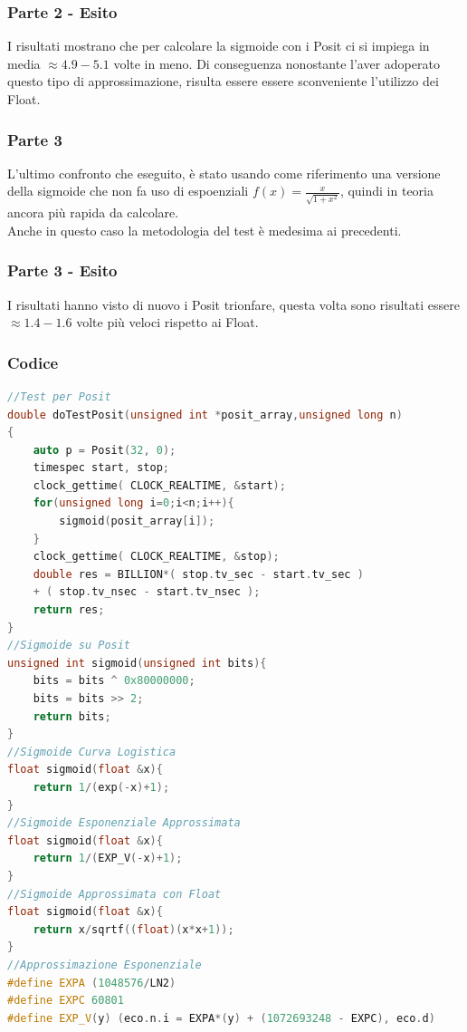 \documentclass[a4paper,11pt]{article}
\begin{document}
\subsubsection{Parte 2 - Esito}

I risultati mostrano che per calcolare la sigmoide con i Posit ci si impiega in media $\approx4.9-5.1$ volte in meno. Di conseguenza nonostante l'aver adoperato questo tipo di approssimazione, risulta essere essere sconveniente l'utilizzo dei Float.

\subsubsection{Parte 3}
L'ultimo confronto che eseguito, è stato usando come riferimento una versione della sigmoide che non fa uso di espoenziali $f(x) = \frac{x}{\sqrt{1+x^{2}}}$, quindi in teoria ancora più rapida da calcolare.\\
Anche in questo caso la metodologia del test è medesima ai precedenti.


\subsubsection{Parte 3 - Esito}

I risultati hanno visto di nuovo i Posit trionfare, questa volta sono risultati essere $\approx1.4-1.6$ volte più veloci rispetto ai Float.
\newpage


\subsubsection{Codice}
\begin{lstlisting}[language=C++]
//Test per Posit
double doTestPosit(unsigned int *posit_array,unsigned long n)
{
	auto p = Posit(32, 0);
	timespec start, stop;
	clock_gettime( CLOCK_REALTIME, &start);
	for(unsigned long i=0;i<n;i++){
		sigmoid(posit_array[i]);	
	}
	clock_gettime( CLOCK_REALTIME, &stop);
	double res = BILLION*( stop.tv_sec - start.tv_sec ) 
	+ ( stop.tv_nsec - start.tv_nsec ); 
	return res;
}
//Sigmoide su Posit
unsigned int sigmoid(unsigned int bits){
	bits = bits ^ 0x80000000;
	bits = bits >> 2;
	return bits;
}
//Sigmoide Curva Logistica
float sigmoid(float &x){
	return 1/(exp(-x)+1);
}
//Sigmoide Esponenziale Approssimata
float sigmoid(float &x){
	return 1/(EXP_V(-x)+1);
}
//Sigmoide Approssimata con Float
float sigmoid(float &x){
	return x/sqrtf((float)(x*x+1));
}
//Approssimazione Esponenziale
#define EXPA (1048576/LN2) 		
#define EXPC 60801 			
#define EXP_V(y) (eco.n.i = EXPA*(y) + (1072693248 - EXPC), eco.d)

\end{lstlisting}
\newpage
\end{document}
